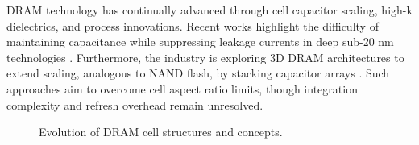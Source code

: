 DRAM technology has continually advanced through cell capacitor scaling, high-k dielectrics, and process innovations. 
Recent works highlight the difficulty of maintaining capacitance while suppressing leakage currents in deep sub-20 nm technologies \cite{choi2022}.
Furthermore, the industry is exploring 3D DRAM architectures to extend scaling, analogous to NAND flash, by stacking capacitor arrays \cite{kim2021_dram}.
Such approaches aim to overcome cell aspect ratio limits, though integration complexity and refresh overhead remain unresolved.

\begin{figure}[!t]
\centering
{}
\caption{Evolution of DRAM cell structures and concepts.}
\label{fig:dram_evolution}
\end{figure}
